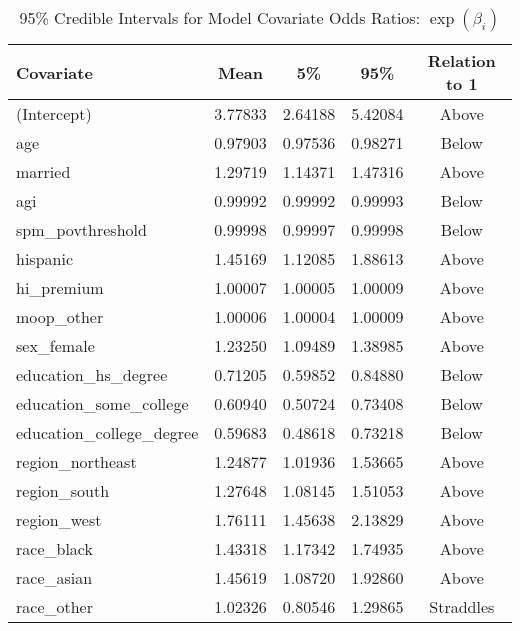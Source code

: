 \begin{table}[h!]
\centering
\begin{tabular}{|l|c|c|c|c|}
\hline
\rowcolor[HTML]{E7EAF6}
\textbf{Covariate} & \textbf{Mean} & \textbf{5\%} & \textbf{95\%} & \textbf{Relation to 1} \\ \hline
(Intercept)              & 3.77833  & 2.64188 & 5.42084 & Above \\ \hline
age                      & 0.97903  & 0.97536 & 0.98271 & Below \\ \hline
married                  & 1.29719  & 1.14371 & 1.47316 & Above \\ \hline
agi                      & 0.99992  & 0.99992 & 0.99993 & Below \\ \hline
spm\_povthreshold         & 0.99998  & 0.99997 & 0.99998 & Below \\ \hline
hispanic                 & 1.45169  & 1.12085 & 1.88613 & Above \\ \hline
hi\_premium               & 1.00007  & 1.00005 & 1.00009 & Above \\ \hline
moop\_other               & 1.00006  & 1.00004 & 1.00009 & Above \\ \hline
sex\_female               & 1.23250  & 1.09489 & 1.38985 & Above \\ \hline
education\_hs\_degree      & 0.71205  & 0.59852 & 0.84880 & Below \\ \hline
education\_some\_college   & 0.60940  & 0.50724 & 0.73408 & Below \\ \hline
education\_college\_degree & 0.59683  & 0.48618 & 0.73218 & Below \\ \hline
region\_northeast         & 1.24877  & 1.01936 & 1.53665 & Above \\ \hline
region\_south             & 1.27648  & 1.08145 & 1.51053 & Above \\ \hline
region\_west              & 1.76111  & 1.45638 & 2.13829 & Above \\ \hline
race\_black               & 1.43318  & 1.17342 & 1.74935 & Above \\ \hline
race\_asian               & 1.45619  & 1.08720 & 1.92860 & Above \\ \hline
race\_other               & 1.02326  & 0.80546 & 1.29865 & Straddles \\ \hline
\end{tabular}
\caption{95\% Credible Intervals for Model Covariate Odds Ratios: $\exp(\beta_i)$}
\end{table}
